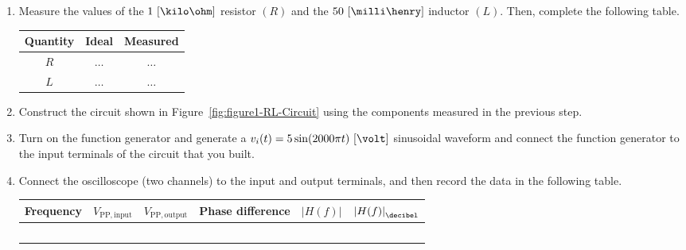 \begin{enumerate}

 
\item Measure the values of the $1~[\kilo\ohm]$ resistor $(R)$ and the $50~[\milli\henry]$ inductor $(L).$ Then, complete the following table.

  \begin{center}
    \begin{tabular}{c|c|c}
      \toprule
      Quantity &  Ideal & Measured\\
      \toprule
      $R$ & $\ldots$ & $\ldots$\\   %
      $L$ & $\ldots$ & $\ldots$\\   %
      \bottomrule
    \end{tabular}    
  \end{center}
  
\item Construct the circuit shown in Figure~\ref{fig:figure1-RL-Circuit} using the components measured in the previous step. 

\item  Turn on the function generator and generate a $v_i(t) = 5\sin(2000\pi t)~[\volt]$ sinusoidal  waveform and connect the function generator to the input terminals of the circuit that you built. 

  
\item Connect the oscilloscope (two channels) to the input and output terminals, and then record the data in the following table. %
%
    \begin{center}
    \begin{tabular}{c|c|c|c|c|c}
      \toprule
      Frequency &  $V_{\mathrm{PP,input}}$ & $V_{\mathrm{PP,output}}$ & Phase difference & $\left |H(f) \right |$ & $\left |H(f) \right |_{\decibel}$\\
      \toprule
      ~ & ~ & ~ & ~ & ~ & ~\\
      \bottomrule
    \end{tabular}    
  \end{center}
%  
    

\end{enumerate}
